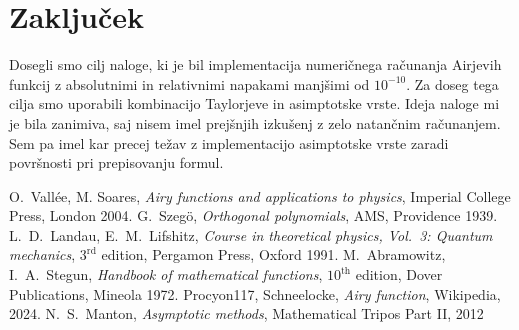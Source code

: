 \documentclass{article}
\begin{document}
\section{Zaključek}
Dosegli smo cilj naloge, ki je bil implementacija numeričnega računanja Airjevih funkcij z absolutnimi in relativnimi napakami manjšimi od $10^{-10}$. Za doseg tega cilja smo uporabili kombinacijo Taylorjeve in asimptotske vrste. Ideja naloge mi je bila zanimiva, saj nisem imel prejšnjih izkušenj z zelo natančnim računanjem. Sem pa imel kar precej težav z implementacijo asimptotske vrste zaradi površnosti pri prepisovanju formul. 
\begin{thebibliography}{99}
    \setlength{\itemsep}{.2\itemsep}\setlength{\parsep}{.5\parsep}
     O.~Vall\'ee, M. Soares,
      {\sl Airy functions and applications to physics},
      Imperial College Press, London 2004.
     G.~Szeg\"o, {\sl Orthogonal polynomials},
      AMS, Providence 1939.
     L.~D.~Landau, E.~M.~Lifshitz, {\sl Course in
      theoretical physics, Vol.~3: Quantum mechanics},
      $3^\mathrm{rd}$ edition, Pergamon Press, Oxford 1991.
     M.~Abramowitz, I.~A.~Stegun, {\sl Handbook of mathematical
      functions}, $10^\mathrm{th}$ edition, Dover Publications, Mineola 1972.
     Procyon117, Schneelocke, {\sl Airy function}, Wikipedia, 2024.
     N.~S.~Manton, {\sl Asymptotic methods}, 
    Mathematical Tripos Part II, 2012
\end{thebibliography}
\end{document}
